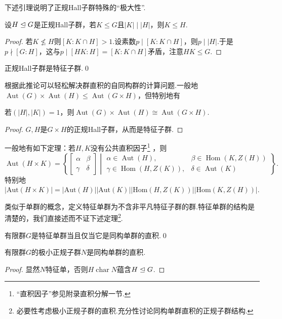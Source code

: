 下述引理说明了正规Hall子群特殊的“极大性”.
\begin{lemma*}
	设$H\trianglelefteq G$是正规Hall子群，若$K\le G$且$|K|\mid|H|$，则$K\le H$.
\end{lemma*}
\begin{proof}
	若$K\nleq H$则$[K:K\cap H]>1$.设素数$p\mid[K:K\cap H]$，则$p\mid|H|$.于是$p\nmid[G:H]$，这与$p\mid[HK:H]=[K:K\cap H]$矛盾，注意$HK\le G$.
\end{proof}
\begin{cor*}
	正规Hall子群是特征子群.\qed
\end{cor*}

根据此推论可以轻松解决群直积的自同构群的计算问题.一般地$\operatorname*{Aut}(G)\times\operatorname*{Aut}(H)\le\operatorname*{Aut}(G\times H)$，但特别地有
\begin{prop}
	若$(|H|,|K|)=1$，则$\operatorname*{Aut}(G)\times\operatorname*{Aut}(H)\cong\operatorname*{Aut}(G\times H)$.
\end{prop}
\begin{proof}
	$G,H$是$G\times H$的正规Hall子群，从而是特征子群.
\end{proof}
\begin{remark}
	一般地有如下定理：若$H,K$没有公共直积因子\footnote{“直积因子”参见附录直积分解一节.} ，则
	\[
		\operatorname*{Aut}(H\times K)=\left\{\begin{bmatrix}
			\alpha&\beta\\
			\gamma&\delta
		\end{bmatrix}\middle| \begin{array}{ll}
			\alpha\in\operatorname*{Aut}(H),&\beta\in\operatorname*{Hom}(K,Z(H))\\
			\gamma\in\operatorname*{Hom}(H,Z(K)),&\delta\in\operatorname*{Aut}(K)
		\end{array}\right\}.
	\]
	特别地$|\mathrm{Aut}(H\times K)|=|\mathrm{Aut}(H)||\mathrm{Aut}(K)||\mathrm{Hom}(H,Z(K))||\mathrm{Hom}(K,Z(H))|$.
\end{remark}

类似于单群的概念，定义{\heiti 特征单群}为不含非平凡特征子群的群.特征单群的结构是清楚的，我们直接述而不证下述定理\footnote{必要性考虑极小正规子群的直积.充分性讨论同构单群直积的正规子群结构.}.
\begin{thm}
	有限群$G$是特征单群当且仅当它是同构单群的直积.\qed
\end{thm}
\begin{cor*}
	有限群$G$的极小正规子群$N$是同构单群的直积.
\end{cor*}
\begin{proof}
	显然$N$特征单，否则$H\operatorname*{char}N$蕴含$H\trianglelefteq G$.
\end{proof}

